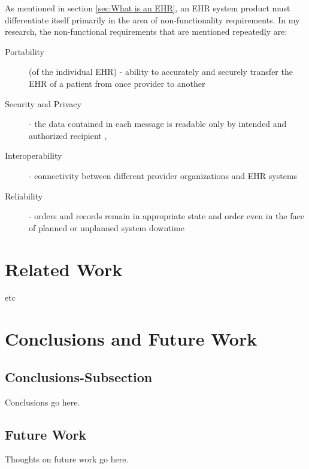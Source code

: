 \documentclass[10pt]{article}
\begin{document}
As mentioned in section \ref{sec:What is an EHR}, an EHR system product must differentiate itself primarily in the area of non-functionality requirements.
In my research, the non-functional requirements that are mentioned repeatedly are:
\begin{description}
	\item[Portability] (of the individual EHR) - ability to accurately and securely transfer the EHR of a patient from once provider to another \cite{ehrbook}
	\item[Security and Privacy] - the data contained in each message is readable only by intended and authorized recipient \cite{ehrbook}, \cite{auditingprivacy}
	\item[Interoperability] - connectivity between different provider organizations and EHR systems \cite{ehrbook}
	\item[Reliability] - orders and records remain in appropriate state and order even in the face of planned or unplanned system downtime  \cite{ehrbook}
\end{description}


\section{Related Work}
\label{sec:Related}
etc

\section{Conclusions and Future Work}

\subsection{Conclusions-Subsection}
\label{sec:Conclusions-Subsection}

Conclusions go here. 

\subsection{Future Work}
\label{sec:Future Work}
Thoughts on future work go here.



\end{document}
